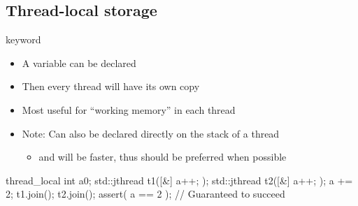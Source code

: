 \subsection[TLS]{Thread-local storage}

\begin{frame}[fragile]
  \begin{block}{ keyword}
    \begin{itemize}
      \item A variable can be declared 
      \item Then every thread will have its own copy
      \item Most useful for ``working memory'' in each thread
      \item Note: Can also be declared directly on the stack of a thread
      \begin{itemize}
        \item and will be faster, thus should be preferred when possible
      \end{itemize}
    \end{itemize}
  \end{block}
  \begin{exampleblock}{}
    \begin{cppcode*}{}
      thread_local int a{0};
      std::jthread t1([&] { a++; });
      std::jthread t2([&] { a++; });
      a += 2;
      t1.join(); t2.join();
      assert( a == 2 ); // Guaranteed to succeed
    \end{cppcode*}
  \end{exampleblock}
\end{frame}
